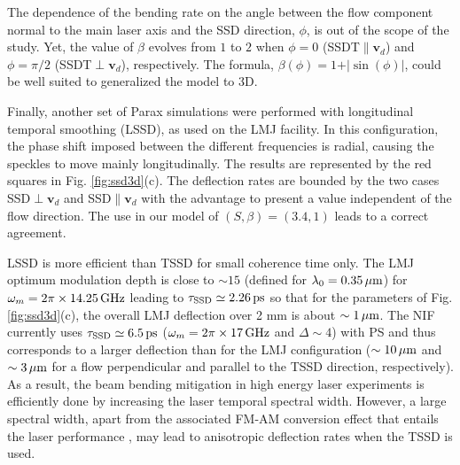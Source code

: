 \documentclass[%
 reprint,
 amsmath,amssymb,
 aps,
]{revtex4-1}
\begin{document}
The dependence of the bending rate on the angle between the flow component normal to the main laser axis and the SSD direction, $\phi$, is out of the scope of the study.
Yet, the value of $\beta$ evolves from  $1$ to $2$ when $\phi=0$ (SSDT$\parallel\mathbf{v}_d$) and $\phi=\pi/2$ (SSDT$\perp\mathbf{v}_d$), respectively. The formula, $\beta(\phi) = 1+\vert \sin(\phi)\vert$, could be well suited to generalized the model to 3D.

%
Finally, another set of  Parax simulations were performed with  longitudinal temporal smoothing (LSSD), as used on the LMJ facility. In this configuration, the phase shift imposed between the different frequencies is radial, 
causing the speckles to move mainly longitudinally.
The results are represented by the red squares in Fig. \ref{fig:ssd3d}(c). The deflection rates are bounded by the two cases SSD$\perp\mathbf{v}_d$ and SSD$\parallel\mathbf{v}_d$ with the advantage to present a value independent of the flow direction. The use in our model of  $(S,\beta)=(3.4,1)$ leads to a correct agreement.

LSSD is more efficient than TSSD for small coherence time only. The LMJ optimum modulation depth is close to $\sim 15$ (defined for $\lambda_0=0.35\,\rm\mu m$) for $\omega_m=2\pi\times14.25\, \rm GHz$ leading to $\tau_\mathrm{SSD}\simeq 2.26\,\rm ps$ so that for the parameters of  Fig. \ref{fig:ssd3d}(c), the overall LMJ  deflection over 2 mm is about $\sim 1\, \rm \mu m$. 
The NIF currently uses $\tau_\mathrm{SSD}\simeq 6.5\,\rm ps$ ($\omega_m=2\pi\times17\, \rm GHz$  and $\Delta\sim4$) with PS and thus  corresponds to  a larger deflection than for the LMJ configuration ($\sim 10\,\rm \mu m$ and $\sim 3\,  \rm \mu m$ for a flow perpendicular and parallel to the TSSD direction, respectively). 
As a result, the beam bending mitigation  in high energy laser experiments is efficiently done by increasing the laser temporal spectral width. However, a large spectral width, apart from the associated FM-AM conversion effect that entails the laser performance \cite[]{Penninckx_FMAM,AO_Huang_2017},   may lead to anisotropic deflection rates when the TSSD is used. 
\end{document}
